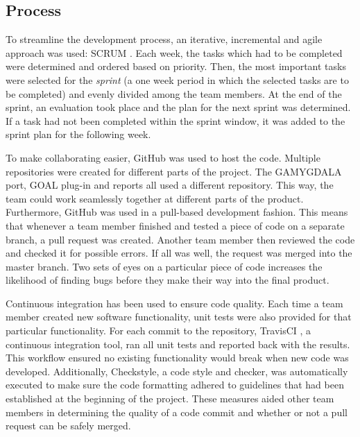 \subsection{Process}
To streamline the development process, an iterative, incremental and agile approach was used: SCRUM \citep{scrum}. Each week, the tasks which had to be completed were determined and ordered based on priority. Then, the most important tasks were selected for the \textit{sprint} (a one week period in which the selected tasks are to be completed) and evenly divided among the team members. At the end of the sprint, an evaluation took place and the plan for the next sprint was determined. If a task had not been completed within the sprint window, it was added to the sprint plan for the following week.

To make collaborating easier, GitHub \citep{gh} was used to host the code. Multiple repositories were created for different parts of the project. The GAMYGDALA port, GOAL plug-in and reports all used a different repository. This way, the team could work seamlessly together at different parts of the product. Furthermore, GitHub was used in a pull-based development fashion. This means that whenever a team member finished and tested a piece of code on a separate branch, a pull request was created. Another team member then reviewed the code and checked it for possible errors. If all was well, the request was merged into the master branch. Two sets of eyes on a particular piece of code increases the likelihood of finding bugs before they make their way into the final product. 

Continuous integration has been used to ensure code quality. Each time a team member created new software functionality, unit tests were also provided for that particular functionality. For each commit to the repository, TravisCI \citep{travis}, a continuous integration tool, ran all unit tests and reported back with the results. This workflow ensured no existing functionality would break when new code was developed. Additionally, Checkstyle, a code style and checker, was automatically executed to make sure the code formatting adhered to guidelines that had been established at the beginning of the project. These measures aided other team members in determining the quality of a code commit and whether or not a pull request can be safely merged.